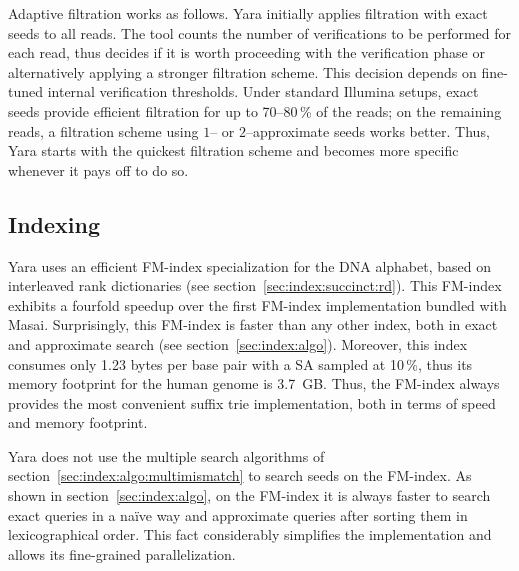 Adaptive filtration works as follows.
Yara initially applies filtration with exact seeds to all reads.
The tool counts the number of verifications to be performed for each read, thus decides if it is worth proceeding with the verification phase or alternatively applying a stronger filtration scheme.
This decision depends on fine-tuned internal verification thresholds.
Under standard Illumina setups, exact seeds provide efficient filtration for up to 70--80\,\% of the reads; on the remaining reads, a filtration scheme using $1$-- or $2$--approximate seeds works better.
Thus, Yara starts with the quickest filtration scheme and becomes more specific whenever it pays off to do so.


\subsection{Indexing}
\label{sec:yara:eng:indexing}

Yara uses an efficient FM-index specialization for the DNA alphabet, based on interleaved rank dictionaries (see section~\ref{sec:index:succinct:rd}).
This FM-index exhibits a fourfold speedup over the first FM-index implementation bundled with Masai.
Surprisingly, this FM-index is faster than any other index, both in exact and approximate search (see section~\ref{sec:index:algo}).
Moreover, this index consumes only 1.23 bytes per base pair with a SA sampled at 10\,\%, thus its memory footprint for the human genome is 3.7~GB.
Thus, the FM-index always provides the most convenient suffix trie implementation, both in terms of speed and memory footprint.

Yara does not use the multiple search algorithms of section~\ref{sec:index:algo:multimismatch} to search seeds on the FM-index.
As shown in section~\ref{sec:index:algo}, on the FM-index it is always faster to search exact queries in a na\"ive way and approximate queries after sorting them in lexicographical order.
This fact considerably simplifies the implementation and allows its fine-grained parallelization.

